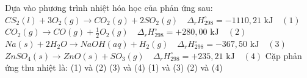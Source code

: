 \documentclass[Main.tex]{subfiles}
\begin{document}
	\begin{ex}
		 Dựa vào phương trình nhiệt hóa học của phản ứng sau:
		$CS_2(l) + 3O_2(g) \longrightarrow CO_2(g) + 2SO_2(g) \quad \Delta_r H_{298}^{\circ} = -1110{,}21 \text{ kJ} \quad (1)$
		$CO_2(g) \longrightarrow CO(g) + \frac{1}{2}O_2(g) \quad \Delta_r H_{298}^{\circ} = +280{,}00 \text{ kJ} \quad (2)$
		$Na(s) + 2H_2O \longrightarrow NaOH(aq) + H_2(g) \quad \Delta_r H_{298}^{\circ} = -367{,}50 \text{ kJ} \quad (3)$
		$ZnSO_4(s) \longrightarrow ZnO(s) + SO_3(g) \quad \Delta_r H_{298}^{\circ} = +235{,}21 \text{ kJ} \quad (4)$
		Cặp phản ứng thu nhiệt là:
		\choice
		{(1) và (2)}
		{(3) và (4)}
		{(1) và (3)}
		{\True (2) và (4)}
	\end{ex}
	
\end{document}
